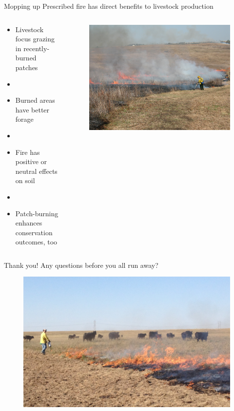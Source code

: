 \documentclass[11pt]{beamer}
\begin{document}
\begin{frame}{Mopping up} 
\alert{Prescribed fire has direct benefits to livestock production}
\begin{columns}
\begin{column}{0.55\textwidth}
\begin{itemize}
	\item Livestock focus grazing in recently-burned patches
	\item[]
	\item Burned areas have better forage
	\item[]
	\item Fire has positive or neutral effects on soil
	\item[]
	\item Patch-burning enhances conservation outcomes, too
\end{itemize}
\end{column}
\begin{column}{0.5\textwidth}  
\begin{center}
\begin{figure}
\includegraphics[width=1\linewidth]{figs/mop_up} 
 \end{figure}
\end{center}
\end{column}
\end{columns}
\end{frame}

\begin{frame}{Thank you!}
Any questions before you all run away?
\begin{center}
\begin{figure}
 \includegraphics[width=1\linewidth]{figs/fire_cows_close} 

 \end{figure}
\end{center}
\end{frame}
\end{document}

